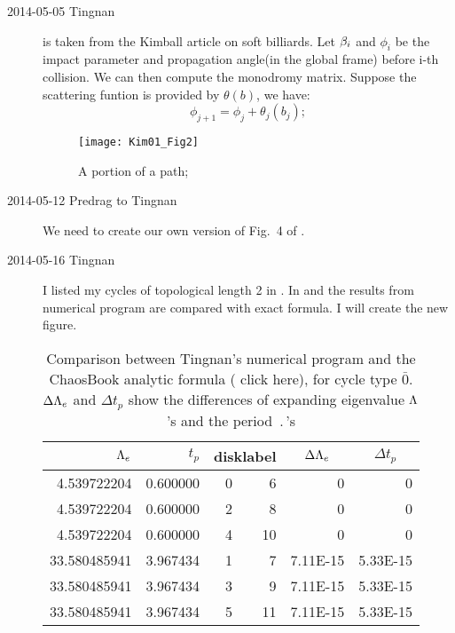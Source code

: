 \begin{description}
\item[2014-05-05 Tingnan]
 is taken from the Kimball article on soft
    billiards. Let $\beta_i$ and $\phi_i$ be the impact parameter and
    propagation angle(in the global frame) before i-th collision. We
    can then compute the monodromy matrix. Suppose the scattering
    funtion is provided by $\theta(b)$, we have:
\[
\phi_{j+1} = \phi_j + \theta_j(b_j);
\]


\begin{figure}
\begin{center}
\texttt{[image: Kim01\_Fig2]}
\end{center}
\caption{
	A portion of a path;
}
\label{KimFig2}
\end{figure}

\item[2014-05-12 Predrag to Tingnan]
We need to create our own version of Fig.~4 of .


\item[2014-05-16 Tingnan] I listed my cycles of topological
    length 2 in . In 
    and  the results from numerical program are
    compared with exact formula. I will create the new figure.

\begin{table}[htbp]
  \centering
  \caption{Comparison between Tingnan's numerical program and
  the ChaosBook analytic formula
  (
  {click here}), for cycle type $\bar{0}$. $\Delta\Lambda_e$ and $\Delta t_p$ show the differences of expanding eigenvalue $\Lambda$'s and  the period $\period{}$'s}
    \begin{tabular}{|r|r|rr|r|r|}
	\hline
    $\Lambda_e$ & $t_p$    & \multicolumn{2}{c|}{disklabel} &\multicolumn{1}{c|}{ $\Delta\Lambda_e$} & \multicolumn{1}{c|}{$\Delta t_p$} \\\hline
    4.539722204 & 0.600000 & 0     & 6     &  0     & 0 \\
    4.539722204 & 0.600000 & 2     & 8     &  0     & 0 \\
    4.539722204 & 0.600000 & 4     & 10    &  0     & 0 \\
    33.580485941 & 3.967434 & 1     & 7     &  7.11E-15 & 5.33E-15 \\
    33.580485941 & 3.967434 & 3     & 9     &  7.11E-15 & 5.33E-15 \\
    33.580485941 & 3.967434 & 5     & 11    &  7.11E-15 & 5.33E-15 \\
    \hline
    \end{tabular}%
  \label{tab:comparison0}%
\end{table}%


\end{description}
